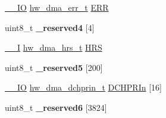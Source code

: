 \begin{DoxyCompactItemize}
\item 
\hyperlink{core__sc300_8h_aec43007d9998a0a0e01faede4133d6be}{\+\_\+\+\_\+\+IO} \hyperlink{union__hw__dma__err}{hw\+\_\+dma\+\_\+err\+\_\+t} \hyperlink{struct__hw__dma_a689a08c0b19fcc38e676ae59040a2640}{E\+RR}
\item 
uint8\+\_\+t {\bfseries \+\_\+reserved4} \mbox{[}4\mbox{]}\hypertarget{struct__hw__dma_abb0cb52b9017bfae961f6bb3cd87d5cd}{}\label{struct__hw__dma_abb0cb52b9017bfae961f6bb3cd87d5cd}

\item 
\hyperlink{core__sc300_8h_af63697ed9952cc71e1225efe205f6cd3}{\+\_\+\+\_\+I} \hyperlink{union__hw__dma__hrs}{hw\+\_\+dma\+\_\+hrs\+\_\+t} \hyperlink{struct__hw__dma_a7cc18d693dc6215c152e9da1db62fc2c}{H\+RS}
\item 
uint8\+\_\+t {\bfseries \+\_\+reserved5} \mbox{[}200\mbox{]}\hypertarget{struct__hw__dma_aca63181b566a1f806a0763a02b1aba89}{}\label{struct__hw__dma_aca63181b566a1f806a0763a02b1aba89}

\item 
\hyperlink{core__sc300_8h_aec43007d9998a0a0e01faede4133d6be}{\+\_\+\+\_\+\+IO} \hyperlink{union__hw__dma__dchprin}{hw\+\_\+dma\+\_\+dchprin\+\_\+t} \hyperlink{struct__hw__dma_ac68863f637bda3360bca574923576a8c}{D\+C\+H\+P\+R\+In} \mbox{[}16\mbox{]}
\item 
uint8\+\_\+t {\bfseries \+\_\+reserved6} \mbox{[}3824\mbox{]}\hypertarget{struct__hw__dma_a2e921e835544eb1325d66d140aa1cac4}{}\label{struct__hw__dma_a2e921e835544eb1325d66d140aa1cac4}


\end{DoxyCompactItemize}
